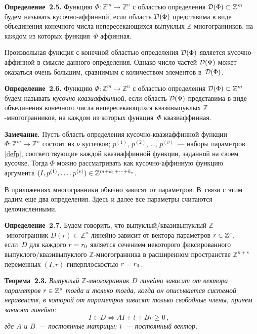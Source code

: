 \begin{multicols}{2}
\smallskip

\noindent
\textbf{Определение~2.5.}
Функцию $\Phi:\mathbb{Z}^m\to\mathbb{Z}^n$ с областью определения
${\cal D}(\Phi)\subset\mathbb{Z}^m$ будем называть ку\-соч\-но-аф\-фин\-ной,
если область ${\cal D}(\Phi)$ представима в виде объединения
конечного числа непересекающихся выпуклых
$\mathbb{Z}$-мно\-го\-гран\-ников, на каждом из которых функция~$\Phi$
аффинная.


Произвольная функция с конечной областью определения ${\cal D}(\Phi)$ является 
ку\-соч\-но-аф\-фин\-ной в смысле данного определения.
Однако число частей ${\cal D}(\Phi)$ может оказаться очень большим,
сравнимым с количеством элементов в~${\cal D}(\Phi)$.

\smallskip

\noindent
\textbf{Определение~2.6.}
Функцию $\Phi:\mathbb{Z}^m\to\mathbb{Z}^n$ с областью определения
${\cal D}(\Phi)\subset\mathbb{Z}^m$ будем называть
\textit{кусочно-ква\-зи\-аф\-фин\-ной}, если область ${\cal D}(\Phi)$
представима в виде объединения конечного числа не\-пе\-ре\-се\-ка\-ющих\-ся
квазивыпуклых $\mathbb{Z}$-мно\-го\-гран\-ников, на каж\-дом из которых
функция~$\Phi$ квазиаффинная.

\smallskip

\noindent
\textbf{Замечание.} Пусть область определения ку\-соч\-но-ква\-зи\-аф\-фин\-ной функции
$\Phi:\mathbb{Z}^m\to\mathbb{Z}^n$ состоит из $\nu$ кусочков;
$p^{(1)}$, $p^{(2)}$, \dots, $p^{(\nu)}$~--- наборы па\-ра\-мет\-ров
\eqref{defp}, соответствующие каждой квазиаффинной функции, заданной
на своем кусочке. Тогда $\Phi$ можно рассматривать как
ку\-соч\-но-аф\-фин\-ную функцию аргумента
$(I,p^{(1)},\ldots,p^{(\nu)})\hm\in\mathbb{Z}^{m+k_1+\cdots+k_\nu}$.

В приложениях многогранники обычно зависят от параметров. В~связи с
этим дадим еще два определения. Здесь и далее все па\-ра\-мет\-ры
считаются целочисленными.

\smallskip

\noindent
\textbf{Определение~2.7.}
Будем говорить, что вы\-пук\-лый/ква\-зи\-вы\-пук\-лый
$\mathbb{Z}$-мно\-го\-гранник $D(r)\subset\mathbb{Z}^n$ линейно
зависит от вектора параметров $r\hm\in\mathbb{Z}^s$, ес\-ли~$D$ для
каждого $r\hm=r_0$ является сечением некоторого фиксированного
выпуклого/квазивыпуклого $\mathbb{Z}$-мно\-го\-гран\-ни\-ка в расширенном
пространстве $\mathbb{Z}^{n+s}$ переменных $(I,r)$ гиперплоскостью
$r\hm=r_0$.


\smallskip

\noindent
\textbf{Теорема~2.3.}
\textit{Выпуклый $\mathbb{Z}$-многогранник $D$ линейно зависит от вектора
параметров $r\hm\in\mathbb{Z}^s$ тогда и только тогда, когда он
описывается системой неравенств, в которой от параметров зависят
только свободные члены, причем зависят линейно:}
\begin{equation*}
I\in D  \Leftrightarrow  AI+t+Br \geq 0\,,
\end{equation*}
\textit{где $A$ и $B$~--- постоянные матрицы; $t$~--- постоянный вектор.}



\end{multicols}
